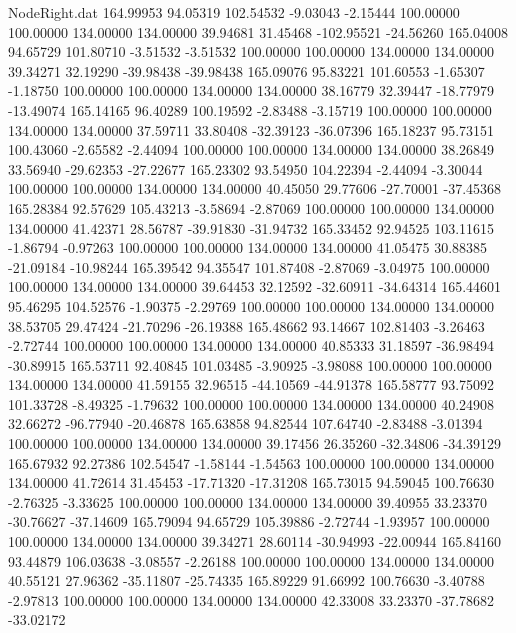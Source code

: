 \begin{filecontents}{NodeRight.dat}
 164.99953   94.05319  102.54532    -9.03043   -2.15444  100.00000  100.00000  134.00000  134.00000   39.94681   31.45468 -102.95521  -24.56260
 165.04008   94.65729  101.80710    -3.51532   -3.51532  100.00000  100.00000  134.00000  134.00000   39.34271   32.19290  -39.98438  -39.98438
 165.09076   95.83221  101.60553    -1.65307   -1.18750  100.00000  100.00000  134.00000  134.00000   38.16779   32.39447  -18.77979  -13.49074
 165.14165   96.40289  100.19592    -2.83488   -3.15719  100.00000  100.00000  134.00000  134.00000   37.59711   33.80408  -32.39123  -36.07396
 165.18237   95.73151  100.43060    -2.65582   -2.44094  100.00000  100.00000  134.00000  134.00000   38.26849   33.56940  -29.62353  -27.22677
 165.23302   93.54950  104.22394    -2.44094   -3.30044  100.00000  100.00000  134.00000  134.00000   40.45050   29.77606  -27.70001  -37.45368
 165.28384   92.57629  105.43213    -3.58694   -2.87069  100.00000  100.00000  134.00000  134.00000   41.42371   28.56787  -39.91830  -31.94732
 165.33452   92.94525  103.11615    -1.86794   -0.97263  100.00000  100.00000  134.00000  134.00000   41.05475   30.88385  -21.09184  -10.98244
 165.39542   94.35547  101.87408    -2.87069   -3.04975  100.00000  100.00000  134.00000  134.00000   39.64453   32.12592  -32.60911  -34.64314
 165.44601   95.46295  104.52576    -1.90375   -2.29769  100.00000  100.00000  134.00000  134.00000   38.53705   29.47424  -21.70296  -26.19388
 165.48662   93.14667  102.81403    -3.26463   -2.72744  100.00000  100.00000  134.00000  134.00000   40.85333   31.18597  -36.98494  -30.89915
 165.53711   92.40845  101.03485    -3.90925   -3.98088  100.00000  100.00000  134.00000  134.00000   41.59155   32.96515  -44.10569  -44.91378
 165.58777   93.75092  101.33728    -8.49325   -1.79632  100.00000  100.00000  134.00000  134.00000   40.24908   32.66272  -96.77940  -20.46878
 165.63858   94.82544  107.64740    -2.83488   -3.01394  100.00000  100.00000  134.00000  134.00000   39.17456   26.35260  -32.34806  -34.39129
 165.67932   92.27386  102.54547    -1.58144   -1.54563  100.00000  100.00000  134.00000  134.00000   41.72614   31.45453  -17.71320  -17.31208
 165.73015   94.59045  100.76630    -2.76325   -3.33625  100.00000  100.00000  134.00000  134.00000   39.40955   33.23370  -30.76627  -37.14609
 165.79094   94.65729  105.39886    -2.72744   -1.93957  100.00000  100.00000  134.00000  134.00000   39.34271   28.60114  -30.94993  -22.00944
 165.84160   93.44879  106.03638    -3.08557   -2.26188  100.00000  100.00000  134.00000  134.00000   40.55121   27.96362  -35.11807  -25.74335
 165.89229   91.66992  100.76630    -3.40788   -2.97813  100.00000  100.00000  134.00000  134.00000   42.33008   33.23370  -37.78682  -33.02172

\end{filecontents}
